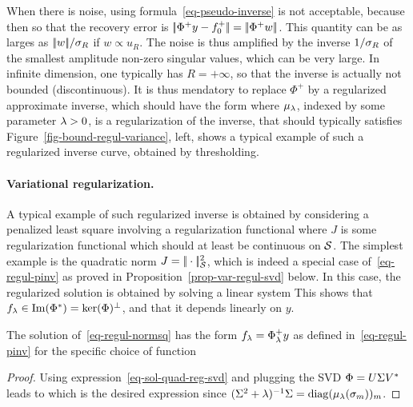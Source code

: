 When there is noise, using formula~\eqref{eq-pseudo-inverse} is not acceptable, because then 
so that the recovery error is $|\!| \Phi^+ y -f_0^+ |\!| = |\!| \Phi^+ w |\!|$. This quantity can be as larges as $|\!| w |\!|/\sigma_R$ if $w \propto u_R$. The noise is thus amplified by the inverse $1/\sigma_R$ of the smallest amplitude non-zero singular values, which can be very large. In infinite dimension, one typically has $R=+\infty$, so that the inverse is actually not bounded (discontinuous). It is thus mendatory to replace $\Phi^+$ by a regularized approximate inverse, which should have the form 
where $\mu_\lambda$, indexed by some parameter $\lambda>0$, is a regularization of the inverse, that should typically satisfies 
Figure~\ref{fig-bound-regul-variance}, left, shows a typical example of such a regularized inverse curve, obtained by thresholding.


\paragraph{Variational regularization.}

A typical example of such regularized inverse is obtained by considering a penalized least square involving a regularization functional
where $J$ is some regularization functional which should at least be continuous on $\mathcal{S}$. The simplest example is the quadratic norm $J=|\!| \cdot |\!|_{\mathcal{S}}^2$, 
which is indeed a special case of~\eqref{eq-regul-pinv} as proved in Proposition~\ref{prop-var-regul-svd} below. In this case, the regularized solution is obtained by solving a linear system
This shows that $f_\lambda \in \operatorname{Im}(\Phi^*) = \ker(\Phi)^\bot$, and that it depends linearly on $y$. 

\begin{prop}\label{prop-var-regul-svd}
	The solution of~\eqref{eq-regul-normsq} has the form $f_\lambda = \Phi^+_\lambda y$ as defined in~\eqref{eq-regul-pinv} for the specific choice of function
\end{prop} 
\begin{proof}
Using expression~\eqref{eq-sol-quad-reg-svd} and plugging the SVD $\Phi = U \Sigma V^*$ leads to
which is the desired expression since $(\Sigma^2 + \lambda)^{-1} \Sigma = \operatorname{diag}(\mu_\lambda(\sigma_m))_m$.
\end{proof}

